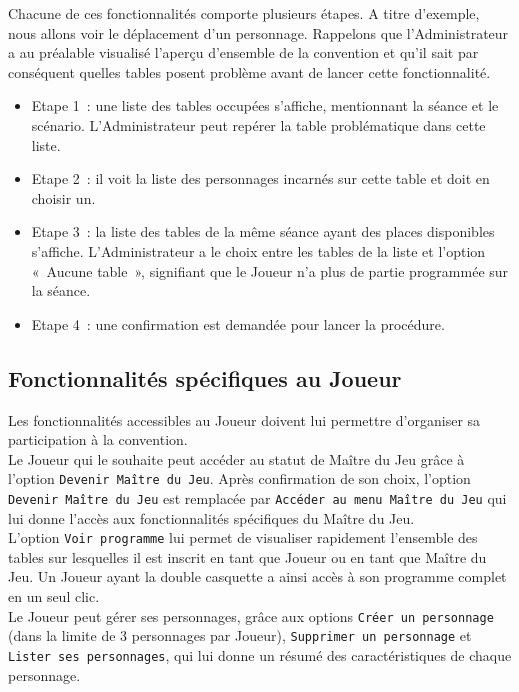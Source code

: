 \documentclass[11pt]{article}
\begin{document}
Chacune de ces fonctionnalités comporte plusieurs étapes. A titre d'exemple, nous allons voir le déplacement d'un personnage. Rappelons que l'Administrateur a au préalable visualisé l'aperçu d'ensemble de la convention et qu'il sait par conséquent quelles tables posent problème avant de lancer cette fonctionnalité. 
\begin{itemize}
    \item Etape 1~: une liste des tables occupées s'affiche, mentionnant la séance et le scénario. L'Administrateur peut repérer la table problématique dans cette liste.
    \item Etape 2~: il voit la liste des personnages incarnés sur cette table et doit en choisir un.
    \item Etape 3~: la liste des tables de la même séance ayant des places disponibles s'affiche. L'Administrateur a le choix entre les tables de la liste et l'option «~Aucune table~», signifiant que le Joueur n'a plus de partie programmée sur la séance.
    \item Etape 4~: une confirmation est demandée pour lancer la procédure.
\end{itemize}



\subsection{Fonctionnalités spécifiques au Joueur} 

Les fonctionnalités accessibles au Joueur doivent lui permettre d'organiser sa participation à la convention.\\

Le Joueur qui le souhaite peut accéder au statut de Maître du Jeu grâce à l'option \texttt{Devenir Maître du Jeu}. Après confirmation de son choix, l'option \texttt{Devenir Maître du Jeu} est remplacée par \texttt{Accéder au menu Maître du Jeu} qui lui donne l'accès aux fonctionnalités spécifiques du Maître du Jeu.\\

L'option \texttt{Voir programme} lui permet de visualiser rapidement l'ensemble des tables sur lesquelles il est inscrit en tant que Joueur ou en tant que Maître du Jeu. Un Joueur ayant la double casquette a ainsi accès à son programme complet en un seul clic.\\

Le Joueur peut gérer ses personnages, grâce aux options \texttt{Créer un personnage} (dans la limite de 3 personnages par Joueur), \texttt{Supprimer un personnage} et \texttt{Lister ses personnages}, qui lui donne un résumé des caractéristiques de chaque personnage.\\
\end{document}
